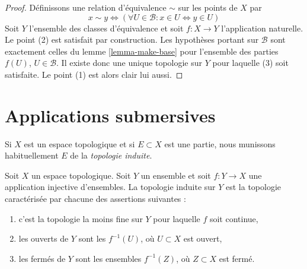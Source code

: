 \begin{proof}
Définissons une relation d'équivalence $\sim$ sur les points de $X$ par
$$
x \sim y \Leftrightarrow
(\forall U \in \mathcal{B} : x \in U \Leftrightarrow y \in U)
$$
Soit $Y$ l'ensemble des classes d'équivalence et soit $f : X \to Y$
l'application naturelle. Le point (2) est satisfait par construction.
Les hypothèses portant sur $\mathcal{B}$ sont exactement celles du
lemme \ref{lemma-make-base} pour l'ensemble des parties $f(U)$,
$U \in \mathcal{B}$. Il existe donc une unique topologie sur $Y$ pour
laquelle (3) soit satisfaite. Le point (1) est alors clair lui aussi.
\end{proof}






\section{Applications submersives}
\label{section-submersive}

\noindent
Si $X$ est un espace topologique et si $E \subset X$ est une partie, nous
munissons habituellement $E$ de la {\it topologie induite}.

\begin{lemma}
\label{lemma-induced}
Soit $X$ un espace topologique. Soit $Y$ un ensemble et soit
$f : Y \to X$ une application injective d'ensembles. La topologie induite sur
$Y$ est la topologie caractérisée par chacune des assertions suivantes :
\begin{enumerate}
\item c'est la topologie la moins fine sur $Y$ pour laquelle $f$ soit continue,
\item les ouverts de $Y$ sont les $f^{-1}(U)$, où $U \subset X$ est ouvert,
\item les fermés de $Y$ sont les ensembles $f^{-1}(Z)$, où $Z \subset X$
est fermé.
\end{enumerate}
\end{lemma}

